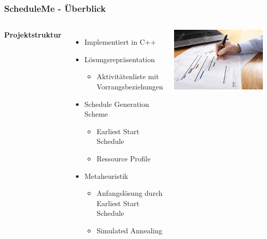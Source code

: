 \documentclass[aspectratio=169]{beamer}
\begin{document}
\begin{frame}
	\frametitle{ScheduleMe - Überblick}
	\begin{columns}[c] %
		
		\textbf{Projektstruktur}
		\begin{itemize}
			\item Implementiert in C++
			\item Lösungsrepräsentation
			\begin{itemize}
				\item Aktivitätenliste mit Vorrangsbeziehungen
			\end{itemize} 
			\item Schedule Generation Scheme
			\begin{itemize}
				\item Earliest Start Schedule
				\item Ressource Profile
			\end{itemize}
			\item Metaheuristik
			\begin{itemize}
				\item Anfangslösung durch Earliest Start Schedule
				\item Simulated Annealing
			\end{itemize}
		\end{itemize}
		\includegraphics[scale=.5]{../images/stock.jpg}
	\end{columns}
\end{frame} 
  
\end{document}
